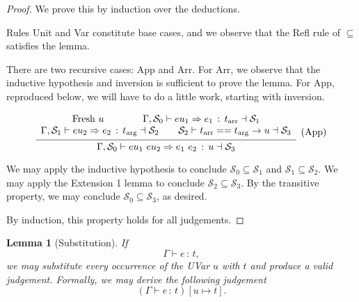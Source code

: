 \documentclass{article}
\newtheorem{lemma}{Lemma}
\newcommand{\G}{\Gamma}
\newcommand{\St}{\mathcal{S}}
\newcommand{\tp}{t}
\newcommand{\tarr}{t_{\text{arr}}}
\newcommand{\targ}{t_{\text{arg}}}
\newcommand{\uv}{u}
\newcommand{\eu}{eu}
\newcommand{\e}{e}
\newcommand{\spc}{\qquad}
\newcommand{\eq}{==}
\renewcommand{\implies}{\Rightarrow}
\newcommand{\fresh}{\text{Fresh}\ }
\newcommand{\withtp}[2]{{#1} \,:\, {#2}}
\newcommand{\app}[2]{{#1}\ {#2}}
\newcommand{\arr}[2]{{#1} \to {#2}}
\newcommand{\hastp}[3]{#1 \vdash {\withtp {#2} {#3}}}
\newcommand{\algtp}[6]{#1, #2 \vdash #3 \implies {\withtp {#4} {#5}} \dashv #6}
\newcommand{\equals}[4]{{#1} \vdash {#2} \eq {#3} \dashv {#4}}
\newcommand{\deduct}[3][]
{
  \begin{prooftree}
    \hypo{#2}
    \infer1[\text{#1}]{#3}
  \end{prooftree}
}
\begin{document}
\begin{proof}
  We prove this by induction over the deductions.

  Rules Unit and Var constitute base cases, and we observe that the Refl rule of
  \(\subseteq\) satisfies the lemma.

  There are two recursive cases: App and Arr. For Arr, we observe that the
  inductive hypothesis and inversion is sufficient to prove the lemma. For App,
  reproduced below, we will have to do a little work, starting with inversion.

  \[
    \deduct
    {\begin{array}{c}
      \fresh \uv \spc \spc
     \algtp \G {\St_0} {\eu_1} {\e_1} \tarr {\St_1} \\
     \algtp \G {\St_1} {\eu_2} {\e_2} \targ {\St_2} \spc
     \equals {\St_2} {\tarr} {\arr {\targ} \uv} {\St_3}
     \end{array}
    }
    {\algtp \G {\St_0} {\app {\eu_1} {\eu_2}} {\app {\e_1} {\e_2}} {\uv} {\St_3}}
    {\text{(App)}}
  \]

  We may apply the inductive hypothesis to conclude \(\St_0 \subseteq \St_1\)
  and \(\St_1 \subseteq \St_2\). We may apply the Extension 1 lemma to conclude
  \(\St_2 \subseteq \St_3\). By the transitive property, we may conclude \(\St_0
  \subseteq \St_3\), as desired.

  By induction, this property holds for all judgements.
\end{proof}

\begin{lemma}[Substitution]
  If
  \[\hastp \G \e \tp, \]
  we may substitute every occurrence of the UVar \(\uv\) with \(\tp\) and produce a valid
  judgement. Formally, we may derive the following judgement
  \[\left( \hastp \G \e \tp \right)[\uv \mapsto \tp].\]
\end{lemma}
\end{document}
